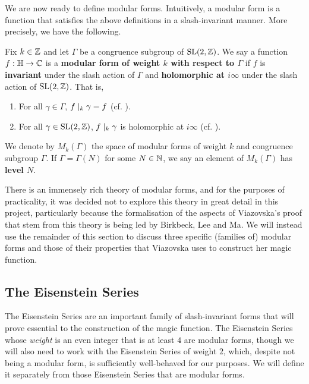 We are now ready to define modular forms. Intuitively, a modular form is a function that satisfies the above definitions in a slash-invariant manner. More precisely, we have the following.

\begin{boxdefinition}
    Fix $k \in \mathbb{Z}$ and let $\Gamma$ be a congruence subgroup of $\operatorname{SL}\!\left( 2, \mathbb{Z} \right)$. We say a function $f : \mathbb{H} \to \mathbb{C}$ is a \textbf{modular form of weight $k$ with respect to $\Gamma$} if $f$ is \textbf{invariant} under the slash action of $\Gamma$ and \textbf{holomorphic at $i\infty$} under the slash action of $\operatorname{SL}\!\left( 2, \mathbb{Z} \right)$. That is,
    \begin{enumerate}
        \item For all $\gamma \in \Gamma$, $f \mid_k \gamma = f$ (cf. ).
        \item For all $\gamma \in \operatorname{SL}\!\left( 2, \mathbb{Z} \right)$, $f \mid_k \gamma$ is holomorphic at $i\infty$ (cf. ).
    \end{enumerate}
    We denote by $M_k(\Gamma)$ the space of modular forms of weight $k$ and congruence subgroup $\Gamma$. If $\Gamma = \Gamma(N)$ for some $N \in \mathbb{N}$, we say an element of $M_k(\Gamma)$ has \textbf{level $N$}.
\end{boxdefinition}

There is an immensely rich theory of modular forms, and for the purposes of practicality, it was decided not to explore this theory in great detail in this project, particularly because the formalisation of the aspects of Viazovska's proof that stem from this theory is being led by Birkbeck, Lee and Ma. We will instead use the remainder of this section to discuss three specific (families of) modular forms and those of their properties that Viazovska uses to construct her magic function.

\subsection{The Eisenstein Series}
\label{Ch2:Subsec:EisensteinSeries}

The Eisenstein Series are an important family of slash-invariant forms that will prove essential to the construction of the magic function. The Eisenstein Series whose \textit{weight} is an even integer that is at least $4$ are modular forms, though we will also need to work with the Eisenstein Series of weight $2$, which, despite not being a modular form, is sufficiently well-behaved for our purposes. We will define it separately from those Eisenstein Series that are modular forms.

